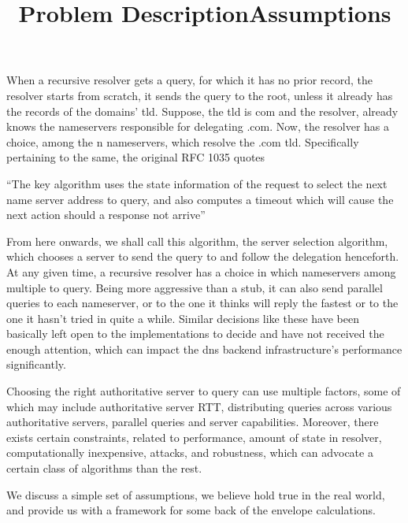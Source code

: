 \documentclass{article} 
\begin{document}
\title{Problem Description}

When a recursive resolver gets a query, for which it has no prior
record, the resolver starts from scratch, it sends the query to the
root, unless it already has the records of the domains' tld. Suppose,
the tld is com and the resolver, already knows the nameservers
responsible for delegating .com. Now, the resolver has a choice, among
the n nameservers, which resolve the .com tld. Specifically pertaining
to the same, the original RFC 1035 quotes

``The key algorithm uses the state information of the request to
select the next name server address to query, and also computes a
timeout which will cause the next action should a response not
arrive''

From here onwards, we shall call this algorithm, the server selection
algorithm, which chooses a server to send the query to and follow the
delegation henceforth. At any given time, a recursive resolver has a
choice in which nameservers among multiple to query. Being more
aggressive than a stub, it can also send parallel queries to each
nameserver, or to the one it thinks will reply the fastest or to the
one it hasn't tried in quite a while. Similar decisions like these
have been basically left open to the implementations to decide and
have not received the enough attention, which can impact the dns
backend infrastructure's performance significantly.

Choosing the right authoritative server to query can use multiple
factors, some of which may include authoritative server RTT,
distributing queries across various authoritative servers, parallel
queries and server capabilities.  Moreover, there exists certain
constraints, related to performance, amount of state in resolver,
computationally inexpensive, attacks, %
and robustness, which can advocate a certain class of algorithms than
the rest.

\begin{comment}
1. What does a recursive resolver do ?  2. DNS recursive resolvers in
the wild 3. Cache misses behavior
\end{comment}

\title{Assumptions} 

We discuss a simple set of assumptions, we believe
hold true in the real world, and provide us with a framework for some
back of the envelope calculations.
\end{document}
